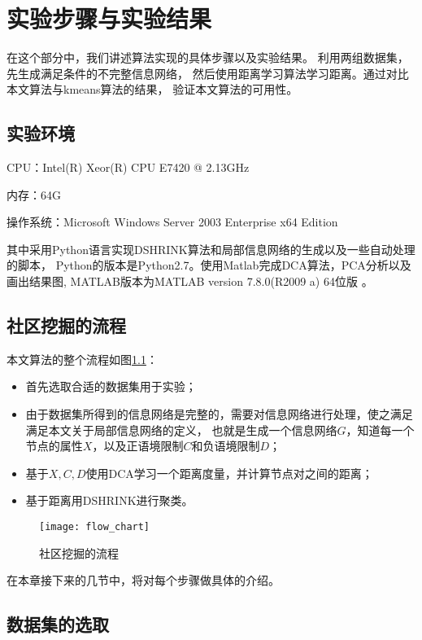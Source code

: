 \chapter{实验步骤与实验结果}
\label{chap:implementation}

在这个部分中，我们讲述算法实现的具体步骤以及实验结果。
利用两组数据集，先生成满足条件的不完整信息网络，
然后使用距离学习算法学习距离。通过对比本文算法与kmeans算法的结果，
验证本文算法的可用性。

\section{实验环境}

CPU：Intel(R) Xeor(R) CPU E7420 @ 2.13GHz

内存：64G

操作系统：Microsoft Windows Server 2003 Enterprise x64 Edition

其中采用Python语言实现DSHRINK算法和局部信息网络的生成以及一些自动处理的脚本，
Python的版本是Python2.7。使用Matlab完成DCA算法，PCA分析以及画出结果图,
MATLAB版本为MATLAB version 7.8.0(R2009 a) 64位版 。

\section{社区挖掘的流程}

本文算法的整个流程如图\ref{fig:flow_chart}：

\begin{itemize}
    \item 首先选取合适的数据集用于实验；
    \item 由于数据集所得到的信息网络是完整的，需要对信息网络进行处理，使之满足满足本文关于局部信息网络的定义，
        也就是生成一个信息网络$G$，知道每一个节点的属性$X$，以及正语境限制$C$和负语境限制$D$；
    \item 基于$X, C, D$使用DCA学习一个距离度量，并计算节点对之间的距离；
    \item 基于距离用DSHRINK进行聚类。
\end{itemize}

\begin{figure}
    \texttt{[image: flow\_chart]}
    \caption{社区挖掘的流程}
    \label{fig:flow_chart}
\end{figure}

在本章接下来的几节中，将对每个步骤做具体的介绍。

\section{数据集的选取}
\label{sec:imple:dataset}

